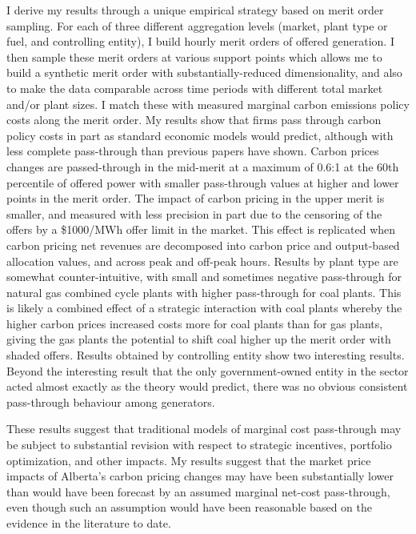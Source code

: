 \documentclass[12pt]{article}
\begin{document}
I derive my results through a unique empirical strategy based on merit order sampling. For each of three different aggregation levels (market, plant type or fuel, and controlling entity), I build hourly merit orders of offered generation. I then sample these merit orders at various support points which allows me to build a synthetic merit order with substantially-reduced dimensionality, and also to make the data comparable across time periods with different total market and/or plant sizes. I match these with measured marginal carbon emissions policy costs along the merit order. My results show that firms pass through carbon policy costs in part as standard economic models would predict, although with less complete pass-through than previous papers have shown. Carbon prices changes are passed-through in the mid-merit at a maximum of 0.6:1 at the 60th percentile of offered power with smaller pass-through values at higher and lower points in the merit order. The impact of carbon pricing in the upper merit is smaller, and measured with less precision in part due to the censoring of the offers by a \$1000/MWh offer limit in the market. This effect is replicated when carbon pricing net revenues are decomposed into carbon price and output-based allocation values, and across peak and off-peak hours. Results by plant type are somewhat counter-intuitive, with small and sometimes negative pass-through for natural gas combined cycle plants with higher pass-through for coal plants. This is likely a combined effect of a strategic interaction with coal plants whereby the higher carbon prices increased costs more for coal plants than for gas plants, giving the gas plants the potential to shift coal higher up the merit order with shaded offers. Results obtained by controlling entity show two interesting results. Beyond the interesting result that the only government-owned entity in the sector acted almost exactly as the theory would predict, there was no obvious consistent pass-through behaviour among generators.

These results suggest that traditional models of marginal cost pass-through may be subject to substantial revision with respect to strategic incentives, portfolio optimization, and other impacts. My results suggest that the market price impacts of Alberta's carbon pricing changes may have been substantially lower than would have been forecast by an assumed marginal net-cost pass-through, even though such an assumption would have been reasonable based on the evidence in the literature to date. 
\end{document}
